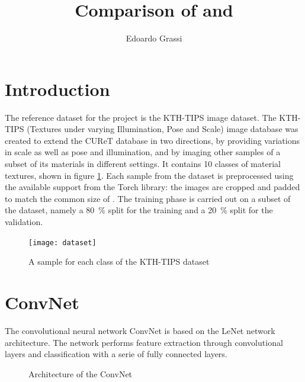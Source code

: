 \documentclass[11pt,a4paper]{article}
\title{Comparison of \convnet and \scatnet}
\author{Edoardo Grassi}
\begin{document}
\maketitle



\section{Introduction}

The reference dataset for the project is the KTH-TIPS image dataset. The KTH-TIPS\cite{Fritz2004THEKD} (Textures under varying Illumination, Pose and Scale) image database was created to extend the CUReT database in two directions, by providing variations in scale as well as pose and illumination, and by imaging other samples of a subset of its materials in different settings. It contains 10 classes of material textures, shown in figure \ref{fig:samples}. Each sample from the dataset is preprocessed using the available support from the Torch library: the images are cropped and padded to match the common size of . The training phase is carried out on a subset of the dataset, namely a \SI{80}{\percent} split for the training and a \SI{20}{\percent} split for the validation.

\begin{figure}\label{fig:samples}
    \texttt{[image: dataset]}
    \centering
    \caption{A sample for each class of the KTH-TIPS dataset}
\end{figure}


\section{ConvNet}

The convolutional neural network ConvNet is based on the LeNet network architecture. The network performs feature extraction through convolutional layers and classification with a serie of fully connected layers.

\begin{figure}
    \label{fig:convnet:structure}
    \caption{Architecture of the ConvNet}
    
\end{figure}
\end{document}
